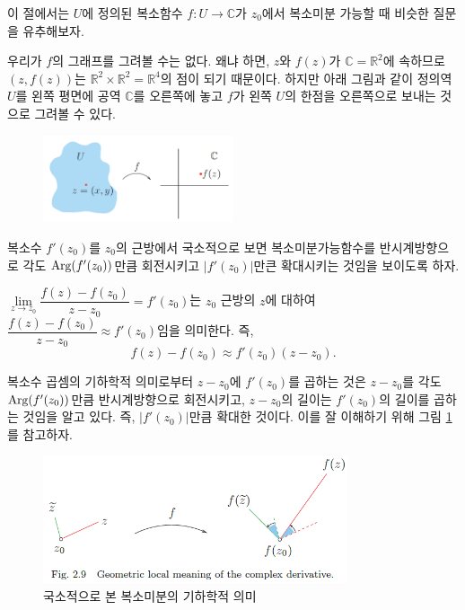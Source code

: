 이 절에서는 $U$에 정의된 복소함수 $f:U \to \mathbb C$가
$z_0$에서 복소미분 가능할 때 비슷한 질문을 유추해보자.
\begin{center}
\end{center}

우리가 $f$의 그래프를 그려볼 수는 없다.
왜냐 하면, $z$와 $f(z)$가 $\mathbb C = \mathbb R^2$에 속하므로
$(z, f(z))$는 $\mathbb R^2 \times \mathbb R^2 = \mathbb R^4$의 점이 되기 때문이다.
하지만 아래 그림과 같이
정의역 $U$를 왼쪽 평면에 공역 $\mathbb C$를 오른쪽에 놓고
$f$가 왼쪽 $U$의 한점을 오른쪽으로 보내는 것으로 그려볼 수 있다.

\begin{figure}[!h]
\begin{center}
\includegraphics[width=0.5\textwidth]{./SaltChapter/fig-2-0-4}
\end{center}
\end{figure}

복소수 $f'(z_0)$를 
$z_0$의 근방에서 국소적으로 보면 
복소미분가능함수를 반시계방향으로 각도 $\mathop{\mathrm{Arg}}(f'(z_0))$만큼 회전시키고
$|f'(z_0)|$만큰 확대시키는 것임을 보이도록 하자.

$\lim\limits_{z\to z_0} \dfrac{f(z) - f(z_0)}{z-z_0} = f'(z_0)$는
$z_0$ 근방의 $z$에 대하여
$\dfrac{f(z) - f(z_0)}{z-z_0} \approx f'(z_0)$임을 의미한다. 즉,
\[
f(z) - f(z_0) \approx f'(z_0)(z-z_0).
\]

복소수 곱셈의 기하학적 의미로부터
$z-z_0$에 $f'(z_0)$를 곱하는 것은
$z-z_0$를 각도 $\mathop{\mathrm{Arg}}(f'(z_0))$만큼 반시계방향으로 회전시키고,
$z-z_0$의 길이는  $f'(z_0)$의 길이를 곱하는 것임을 알고 있다. 즉, $|f'(z_0)|$만큼 확대한 것이다.
이를 잘 이해하기 위해 그림 \ref{fig-2-9}를 참고하자.

\begin{figure}[!h]
\begin{center}
\includegraphics[width=0.8\textwidth]{./SaltChapter/fig-2-9}
\end{center}
\caption{국소적으로 본 복소미분의 기하학적 의미}
\label{fig-2-9}
\end{figure}

